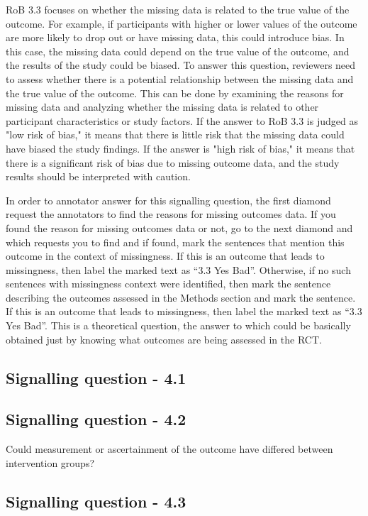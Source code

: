 \documentclass[sn-mathphys,Numbered]{sn-jnl}%
\begin{document}
RoB 3.3 focuses on whether the missing data is related to the true value of the outcome.
For example, if participants with higher or lower values of the outcome are more likely to drop out or have missing data, this could introduce bias.
In this case, the missing data could depend on the true value of the outcome, and the results of the study could be biased.
To answer this question, reviewers need to assess whether there is a potential relationship between the missing data and the true value of the outcome.
This can be done by examining the reasons for missing data and analyzing whether the missing data is related to other participant characteristics or study factors.
If the answer to RoB 3.3 is judged as "low risk of bias," it means that there is little risk that the missing data could have biased the study findings.
If the answer is "high risk of bias," it means that there is a significant risk of bias due to missing outcome data, and the study results should be interpreted with caution.

In order to annotator answer for this signalling question, the first diamond request the annotators to find the reasons for missing outcomes data.
If you found the reason for missing outcomes data or not, go to the next diamond and which requests you to find and if found, mark the sentences that mention this outcome in the context of missingness.
If this is an outcome that leads to missingness, then label the marked text as ``3.3 Yes Bad''.
Otherwise, if no such sentences with missingness context were identified, then mark the sentence describing the outcomes assessed in the Methods section and mark the sentence.
If this is an outcome that leads to missingness, then label the marked text as ``3.3 Yes Bad''.
This is a theoretical question, the answer to which could be basically obtained just by knowing what outcomes are being assessed in the RCT.
%
%
%
\subsection*{Signalling question - 4.1 }
%

%
%
%
\subsection*{Signalling question - 4.2 }
%
Could measurement or ascertainment of the outcome have differed between intervention groups?
%
%
%
\subsection*{Signalling question - 4.3 }
%
\end{document}
